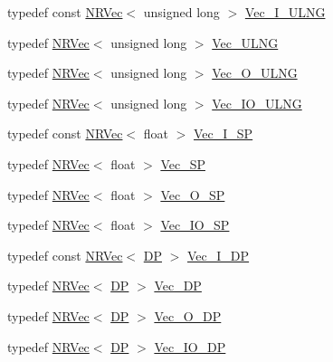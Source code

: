 \begin{DoxyCompactItemize}
\item 
typedef const \mbox{\hyperlink{classNR_1_1NRVec}{N\+R\+Vec}}$<$ unsigned long $>$ \mbox{\hyperlink{namespaceNR_a117570729decc729db86f7655e7a23e5}{Vec\+\_\+\+I\+\_\+\+U\+L\+NG}}
\item 
typedef \mbox{\hyperlink{classNR_1_1NRVec}{N\+R\+Vec}}$<$ unsigned long $>$ \mbox{\hyperlink{namespaceNR_a5c7370f8964ba27e0aa18ff2b2516734}{Vec\+\_\+\+U\+L\+NG}}
\item 
typedef \mbox{\hyperlink{classNR_1_1NRVec}{N\+R\+Vec}}$<$ unsigned long $>$ \mbox{\hyperlink{namespaceNR_a111b6302e9ace403b90a1d801f0c70a2}{Vec\+\_\+\+O\+\_\+\+U\+L\+NG}}
\item 
typedef \mbox{\hyperlink{classNR_1_1NRVec}{N\+R\+Vec}}$<$ unsigned long $>$ \mbox{\hyperlink{namespaceNR_a3b5de5b305729eeca6289dfee2a39229}{Vec\+\_\+\+I\+O\+\_\+\+U\+L\+NG}}
\item 
typedef const \mbox{\hyperlink{classNR_1_1NRVec}{N\+R\+Vec}}$<$ float $>$ \mbox{\hyperlink{namespaceNR_a71d18e93c460e6909aea027558a47cf5}{Vec\+\_\+\+I\+\_\+\+SP}}
\item 
typedef \mbox{\hyperlink{classNR_1_1NRVec}{N\+R\+Vec}}$<$ float $>$ \mbox{\hyperlink{namespaceNR_af83af2cf4cf885729545ae16ad25607b}{Vec\+\_\+\+SP}}
\item 
typedef \mbox{\hyperlink{classNR_1_1NRVec}{N\+R\+Vec}}$<$ float $>$ \mbox{\hyperlink{namespaceNR_ab5c69ea1aee9a86bcaed5efdcc803162}{Vec\+\_\+\+O\+\_\+\+SP}}
\item 
typedef \mbox{\hyperlink{classNR_1_1NRVec}{N\+R\+Vec}}$<$ float $>$ \mbox{\hyperlink{namespaceNR_a761149b0404c64b2a5a0357c44d80b19}{Vec\+\_\+\+I\+O\+\_\+\+SP}}
\item 
typedef const \mbox{\hyperlink{classNR_1_1NRVec}{N\+R\+Vec}}$<$ \mbox{\hyperlink{namespaceNR_af6ff762dd605ff477b8e52387253a02a}{DP}} $>$ \mbox{\hyperlink{namespaceNR_a9f943da53862537c552e2a770cb170ae}{Vec\+\_\+\+I\+\_\+\+DP}}
\item 
typedef \mbox{\hyperlink{classNR_1_1NRVec}{N\+R\+Vec}}$<$ \mbox{\hyperlink{namespaceNR_af6ff762dd605ff477b8e52387253a02a}{DP}} $>$ \mbox{\hyperlink{namespaceNR_a115a3196718c98e8e2562d80b06c23c5}{Vec\+\_\+\+DP}}
\item 
typedef \mbox{\hyperlink{classNR_1_1NRVec}{N\+R\+Vec}}$<$ \mbox{\hyperlink{namespaceNR_af6ff762dd605ff477b8e52387253a02a}{DP}} $>$ \mbox{\hyperlink{namespaceNR_a970094d23441f8ef6a45282a7eb2103d}{Vec\+\_\+\+O\+\_\+\+DP}}
\item 
typedef \mbox{\hyperlink{classNR_1_1NRVec}{N\+R\+Vec}}$<$ \mbox{\hyperlink{namespaceNR_af6ff762dd605ff477b8e52387253a02a}{DP}} $>$ \mbox{\hyperlink{namespaceNR_ab293e06a6bf799d8a7ed932b6852bcb8}{Vec\+\_\+\+I\+O\+\_\+\+DP}}

\end{DoxyCompactItemize}

